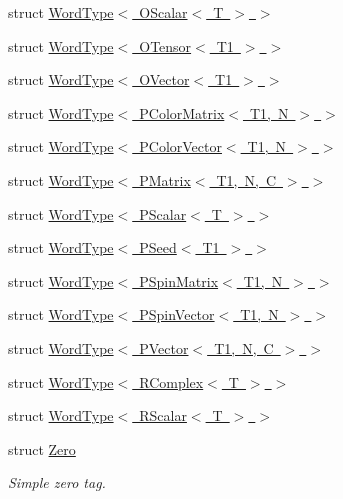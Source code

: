 \begin{DoxyCompactItemize}
\item 
struct \mbox{\hyperlink{structENSEM_1_1WordType_3_01OScalar_3_01T_01_4_01_4}{Word\+Type$<$ O\+Scalar$<$ T $>$ $>$}}
\item 
struct \mbox{\hyperlink{structENSEM_1_1WordType_3_01OTensor_3_01T1_01_4_01_4}{Word\+Type$<$ O\+Tensor$<$ T1 $>$ $>$}}
\item 
struct \mbox{\hyperlink{structENSEM_1_1WordType_3_01OVector_3_01T1_01_4_01_4}{Word\+Type$<$ O\+Vector$<$ T1 $>$ $>$}}
\item 
struct \mbox{\hyperlink{structENSEM_1_1WordType_3_01PColorMatrix_3_01T1_00_01N_01_4_01_4}{Word\+Type$<$ P\+Color\+Matrix$<$ T1, N $>$ $>$}}
\item 
struct \mbox{\hyperlink{structENSEM_1_1WordType_3_01PColorVector_3_01T1_00_01N_01_4_01_4}{Word\+Type$<$ P\+Color\+Vector$<$ T1, N $>$ $>$}}
\item 
struct \mbox{\hyperlink{structENSEM_1_1WordType_3_01PMatrix_3_01T1_00_01N_00_01C_01_4_01_4}{Word\+Type$<$ P\+Matrix$<$ T1, N, C $>$ $>$}}
\item 
struct \mbox{\hyperlink{structENSEM_1_1WordType_3_01PScalar_3_01T_01_4_01_4}{Word\+Type$<$ P\+Scalar$<$ T $>$ $>$}}
\item 
struct \mbox{\hyperlink{structENSEM_1_1WordType_3_01PSeed_3_01T1_01_4_01_4}{Word\+Type$<$ P\+Seed$<$ T1 $>$ $>$}}
\item 
struct \mbox{\hyperlink{structENSEM_1_1WordType_3_01PSpinMatrix_3_01T1_00_01N_01_4_01_4}{Word\+Type$<$ P\+Spin\+Matrix$<$ T1, N $>$ $>$}}
\item 
struct \mbox{\hyperlink{structENSEM_1_1WordType_3_01PSpinVector_3_01T1_00_01N_01_4_01_4}{Word\+Type$<$ P\+Spin\+Vector$<$ T1, N $>$ $>$}}
\item 
struct \mbox{\hyperlink{structENSEM_1_1WordType_3_01PVector_3_01T1_00_01N_00_01C_01_4_01_4}{Word\+Type$<$ P\+Vector$<$ T1, N, C $>$ $>$}}
\item 
struct \mbox{\hyperlink{structENSEM_1_1WordType_3_01RComplex_3_01T_01_4_01_4}{Word\+Type$<$ R\+Complex$<$ T $>$ $>$}}
\item 
struct \mbox{\hyperlink{structENSEM_1_1WordType_3_01RScalar_3_01T_01_4_01_4}{Word\+Type$<$ R\+Scalar$<$ T $>$ $>$}}
\item 
struct \mbox{\hyperlink{structENSEM_1_1Zero}{Zero}}
\begin{DoxyCompactList}\small\item\em Simple zero tag. \end{DoxyCompactList}\end{DoxyCompactItemize}
